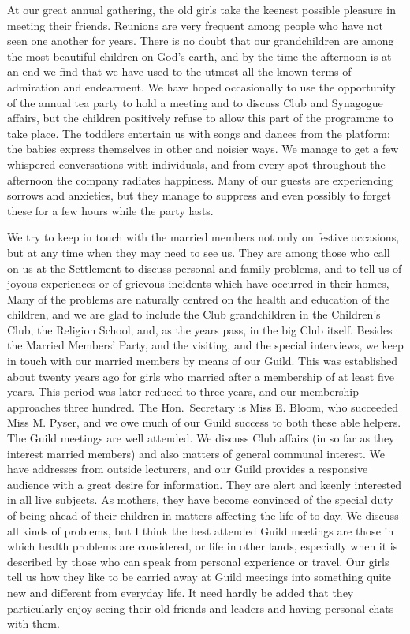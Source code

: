 At our great annual gathering, the old girls take the
keenest possible pleasure in meeting their friends. Reunions
are very frequent among people who have not seen
one another for years. There is no doubt that our grandchildren
are among the most beautiful children on God’s
earth, and by the time the afternoon is at an end we find
that we have used to the utmost all the known terms of
admiration and endearment. We have hoped occasionally
to use the opportunity of the annual tea party to hold a
meeting and to discuss Club and Synagogue affairs, but
the children positively refuse to allow this part of the
programme to take place. The toddlers entertain us with
songs and dances from the platform; the babies express
themselves in other and noisier ways. We manage to get
a few whispered conversations with individuals, and from
every spot throughout the afternoon the company
radiates happiness. Many of our guests are experiencing
sorrows and anxieties, but they manage to suppress and
even possibly to forget these for a few hours while the
party lasts.

We try to keep in touch with the married members not
only on festive occasions, but at any time when they may
need to see us. They are among those who call on us at
the Settlement to discuss personal and family problems,
and to tell us of joyous experiences or of grievous incidents
which have occurred in their homes, Many of the
problems are naturally centred on the health and education
of the children, and we are glad to include the Club
grandchildren in the Children’s Club, the Religion
School, and, as the years pass, in the big Club itself.
Besides the Married Members’ Party, and the visiting,
and the special interviews, we keep in touch with our
married members by means of our Guild. This was established
about twenty years ago for girls who married after
a membership of at least five years. This period was later
reduced to three years, and our membership approaches
three hundred. The Hon.\ Secretary is Miss E. Bloom,
who succeeded Miss M. Pyser, and we owe much of our
Guild success to both these able helpers. The Guild meetings
are well attended. We discuss Club affairs (in so
far as they interest married members) and also matters of
general communal interest. We have addresses from outside
lecturers, and our Guild provides a responsive
audience with a great desire for information. They are
alert and keenly interested in all live subjects. As
mothers, they have become convinced of the special duty
of being ahead of their children in matters affecting the
life of to-day. We discuss all kinds of problems, but I
think the best attended Guild meetings are those in which
health problems are considered, or life in other lands,
especially when it is described by those who can speak
from personal experience or travel. Our girls tell us how
they like to be carried away at Guild meetings into something
quite new and different from everyday life. It need
hardly be added that they particularly enjoy seeing their
old friends and leaders and having personal chats with
them.

